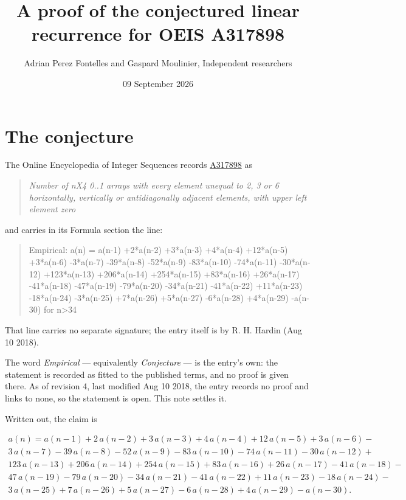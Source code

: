 \documentclass[11pt]{article}
\title{A proof of the conjectured linear recurrence for OEIS A317898}
\author{Adrian Perez Fontelles and Gaspard Moulinier, Independent researchers}
\date{09 September 2026}
\theoremstyle{definition}
\begin{document}
\maketitle
\section{The conjecture}

The Online Encyclopedia of Integer Sequences records \href{https://oeis.org/A317898}{A317898} as

\begin{quote}\itshape Number of nX4 0..1 arrays with every element unequal to 2, 3 or 6 horizontally, vertically or antidiagonally adjacent elements, with upper left element zero\end{quote}

and carries in its Formula section the line:

\begin{quote}\ttfamily Empirical: a(n) = a(n-1) +2*a(n-2) +3*a(n-3) +4*a(n-4) +12*a(n-5) +3*a(n-6) -3*a(n-7) -39*a(n-8) -52*a(n-9) -83*a(n-10) -74*a(n-11) -30*a(n-12) +123*a(n-13) +206*a(n-14) +254*a(n-15) +83*a(n-16) +26*a(n-17) -41*a(n-18) -47*a(n-19) -79*a(n-20) -34*a(n-21) -41*a(n-22) +11*a(n-23) -18*a(n-24) -3*a(n-25) +7*a(n-26) +5*a(n-27) -6*a(n-28) +4*a(n-29) -a(n-30) for n>34\end{quote}

That line carries no separate signature; the entry itself is by R. H. Hardin (Aug 10 2018).

The word {\itshape Empirical} --- equivalently {\itshape Conjecture} --- is the entry's own: the statement is recorded as fitted to the published terms, and no proof is given there. As of revision 4, last modified Aug 10 2018, the entry records no proof and links to none, so the statement is open. This note settles it.

Written out, the claim is

\begin{multline*} a(n) = a(n-1) + 2\,a(n-2) + 3\,a(n-3) + 4\,a(n-4) + 12\,a(n-5) + 3\,a(n-6) - \\ 3\,a(n-7) - 39\,a(n-8) - 52\,a(n-9) - 83\,a(n-10) - 74\,a(n-11) - 30\,a(n-12) + \\ 123\,a(n-13) + 206\,a(n-14) + 254\,a(n-15) + 83\,a(n-16) + 26\,a(n-17) - 41\,a(n-18) - \\ 47\,a(n-19) - 79\,a(n-20) - 34\,a(n-21) - 41\,a(n-22) + 11\,a(n-23) - 18\,a(n-24) - \\ 3\,a(n-25) + 7\,a(n-26) + 5\,a(n-27) - 6\,a(n-28) + 4\,a(n-29) - a(n-30). \end{multline*}
\end{document}
